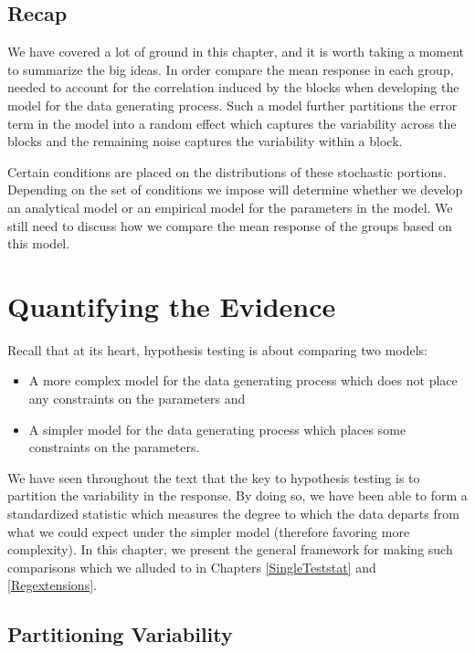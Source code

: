 \documentclass[]{book}
\providecommand{\tightlist}{%
  \setlength{\itemsep}{0pt}\setlength{\parskip}{0pt}}
\theoremstyle{plain}
\theoremstyle{mydefn}
\theoremstyle{myexmpl}
\theoremstyle{remark}
\begin{document}
\section{Recap}\label{recap-3}

We have covered a lot of ground in this chapter, and it is worth taking
a moment to summarize the big ideas. In order compare the mean response
in each group, needed to account for the correlation induced by the
blocks when developing the model for the data generating process. Such a
model further partitions the error term in the model into a random
effect which captures the variability across the blocks and the
remaining noise captures the variability within a block.

Certain conditions are placed on the distributions of these stochastic
portions. Depending on the set of conditions we impose will determine
whether we develop an analytical model or an empirical model for the
parameters in the model. We still need to discuss how we compare the
mean response of the groups based on this model.

\chapter{Quantifying the Evidence}\label{Blockteststat}

Recall that at its heart, hypothesis testing is about comparing two
models:

\begin{itemize}
\tightlist
\item
  A more complex model for the data generating process which does not
  place any constraints on the parameters and
\item
  A simpler model for the data generating process which places some
  constraints on the parameters.
\end{itemize}

We have seen throughout the text that the key to hypothesis testing is
to partition the variability in the response. By doing so, we have been
able to form a standardized statistic which measures the degree to which
the data departs from what we could expect under the simpler model
(therefore favoring more complexity). In this chapter, we present the
general framework for making such comparisons which we alluded to in
Chapters \ref{SingleTeststat} and \ref{Regextensions}.

\section{Partitioning Variability}\label{partitioning-variability-2}
\end{document}
